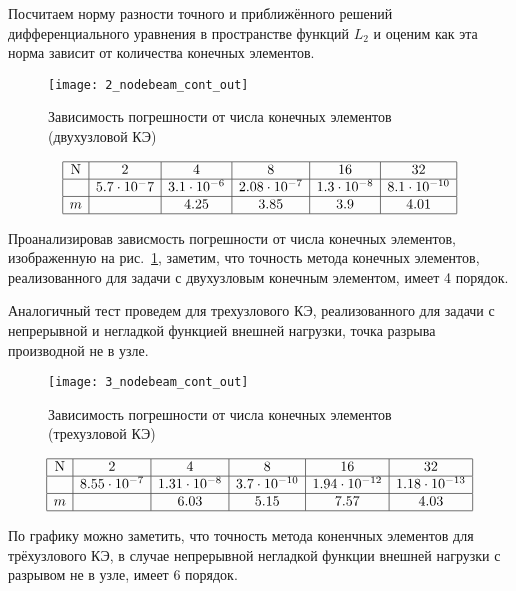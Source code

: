 \documentclass[12pt,a4paper]{article}
\begin{document}
Посчитаем норму разности точного и приближённого решений дифференциального уравнения в пространстве функций $L_{2}$  и оценим как эта норма зависит от количества конечных элементов.\\

\begin{figure}[H]
		\centering
		\texttt{[image: 2\_nodebeam\_cont\_out]}
		\caption{Зависимость погрешности от числа конечных элементов (двухузловой КЭ)}
		\label{fig:2_nodebeam_cont_out}
	\end{figure}


\[
\begin{array}{|c|c|c|c|c|c|}
\hline
\text{N} & 2 & 4 & 8 & 16 & 32 \\ \hline
\Delta  & 5.7 \cdot 10^-7 & 3.1 \cdot 10^{-6} & 2.08 \cdot 10^{-7} & 1.3 \cdot 10^{-8} & 8.1 \cdot 10^{-10}\\ \hline
m  &  &4.25 & 3.85 & 3.9 & 4.01 \\ 
\hline
\end{array}
\]

Проанализировав зависмость погрешности от числа конечных элементов, изображенную на рис.~\ref{fig:2_nodebeam_cont_out}, заметим, что точность метода конечных элементов, реализованного для задачи с двухузловым конечным элементом, имеет 4 порядок. 


Аналогичный тест проведем для трехузлового КЭ, реализованного для задачи с непрерывной и негладкой функцией внешней нагрузки, точка разрыва производной не в узле.  
\begin{figure}[H]
		\centering
		\texttt{[image: 3\_nodebeam\_cont\_out]}
		\caption{Зависимость погрешности от числа конечных элементов (трехузловой КЭ)}
		\label{3_nodebeam_cont_out}
	\end{figure}


\[
\begin{array}{|c|c|c|c|c|c|}
\hline
\text{N} & 2 & 4 & 8 & 16 & 32 \\ \hline
\Delta  & 8.55 \cdot 10^{-7} & 1.31 \cdot 10^{-8} & 3.7 \cdot 10^{-10} & 1.94 \cdot 10^{-12} & 1.18 \cdot 10^{-13}  \\ \hline
m  & & 6.03 & 5.15 & 7.57 & 4.03 \text{} \\ 
\hline
\end{array}
\]

По графику можно заметить, что точность метода коненчных элементов для трёхузлового КЭ, в случае непрерывной негладкой функции внешней нагрузки с разрывом не в узле, имеет 6 порядок.\\
\end{document}
